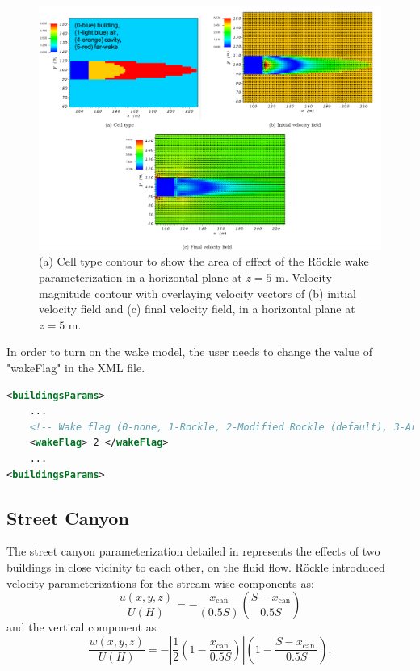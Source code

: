 \begin{figure}[H]
    \centering
    \includegraphics[width=\textwidth]{Images/wake_z_5_1.pdf}
    \caption{(a) Cell type contour to show the area of effect of the R\"{o}ckle wake parameterization in a horizontal plane at $z=5$ m. Velocity magnitude contour with overlaying velocity vectors of (b) initial velocity field and (c) final velocity field, in a horizontal plane at $z=5$ m.}
\end{figure}

In order to turn on the wake model, the user needs to change the value of "wakeFlag" in the XML file.

\begin{lstlisting}[language=XML]
<buildingsParams>
	...
	<!-- Wake flag (0-none, 1-Rockle, 2-Modified Rockle (default), 3-Area Scaled) -->
	<wakeFlag> 2 </wakeFlag> 	
	... 				
<buildingsParams>
\end{lstlisting}

\subsection{Street Canyon}

The street canyon parameterization detailed in \cite{singh2008evaluation} represents the effects of two buildings in close vicinity to each other, on the fluid flow. R\"{o}ckle \cite{rockle1990bestimmung} introduced velocity parameterizations for the stream-wise components as: 
\begin{equation}
\frac{u(x, y, z)}{U(H)}=-\frac{x_{\mathrm{can}}}{(0.5 S)}\left(\frac{S-x_{\mathrm{can}}}{0.5 S}\right)
\label{eq:u_can}
\end{equation}
and the vertical component as 
\begin{equation}
\frac{w(x, y, z)}{U(H)}=-\left|\frac{1}{2}\left(1-\frac{x_{\text {can }}}{0.5 S}\right)\right|\left(1-\frac{S-x_{\text {can }}}{0.5 S}\right).
\label{eq:w_can}
\end{equation}

